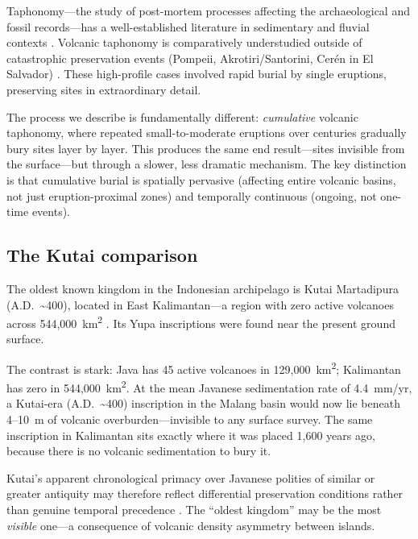\documentclass[12pt,letterpaper]{article}
\begin{document}
Taphonomy---the study of post-mortem processes affecting the archaeological and fossil records---has a well-established literature in sedimentary and fluvial contexts \citep{schiffer1987}. Volcanic taphonomy is comparatively understudied outside of catastrophic preservation events (Pompeii, Akrotiri/Santorini, Cer\'{e}n in El Salvador) \citep{sigurdsson1985,doumas1983,sheets1992}. These high-profile cases involved rapid burial by single eruptions, preserving sites in extraordinary detail.

The process we describe is fundamentally different: \textit{cumulative} volcanic taphonomy, where repeated small-to-moderate eruptions over centuries gradually bury sites layer by layer. This produces the same end result---sites invisible from the surface---but through a slower, less dramatic mechanism. The key distinction is that cumulative burial is spatially pervasive (affecting entire volcanic basins, not just eruption-proximal zones) and temporally continuous (ongoing, not one-time events).

\subsection{The Kutai comparison}

The oldest known kingdom in the Indonesian archipelago is Kutai Martadipura (A.D.~\textasciitilde 400), located in East Kalimantan---a region with zero active volcanoes across 544,000~km\textsuperscript{2} \citep{vogel1918}. Its Yupa inscriptions were found near the present ground surface.

The contrast is stark: Java has 45 active volcanoes in 129,000~km\textsuperscript{2}; Kalimantan has zero in 544,000~km\textsuperscript{2}. At the mean Javanese sedimentation rate of 4.4~mm/yr, a Kutai-era (A.D.~\textasciitilde 400) inscription in the Malang basin would now lie beneath 4--10~m of volcanic overburden---invisible to any surface survey. The same inscription in Kalimantan sits exactly where it was placed 1,600 years ago, because there is no volcanic sedimentation to bury it.

Kutai's apparent chronological primacy over Javanese polities of similar or greater antiquity may therefore reflect differential preservation conditions rather than genuine temporal precedence \citep{coedes1968,miksic2004}. The ``oldest kingdom'' may be the most \textit{visible} one---a consequence of volcanic density asymmetry between islands.

\end{document}
